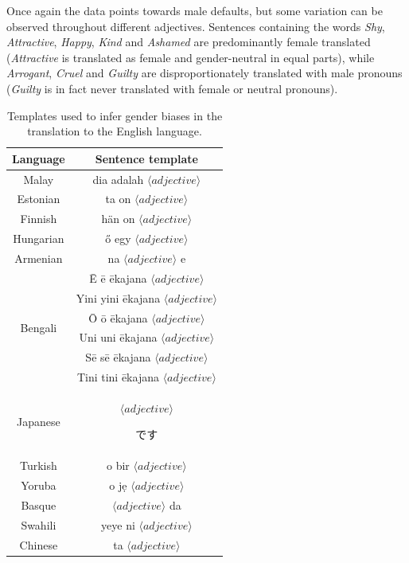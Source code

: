 \documentclass[fleqn,10pt]{article}
\begin{document}
Once again the data points towards male defaults, but some variation can be observed throughout different adjectives. Sentences containing the words \emph{Shy}, \emph{Attractive}, \emph{Happy}, \emph{Kind} and \emph{Ashamed} are predominantly female translated (\emph{Attractive} is translated as female and gender-neutral in equal parts), while \emph{Arrogant}, \emph{Cruel} and \emph{Guilty} are disproportionately translated with male pronouns (\emph{Guilty} is in fact never translated with female or neutral pronouns).

\begin{table}[H]
\centering
\small{
	\begin{tabular}{|c|c|}
	\hline
	Language 	& Sentence template 													\\ \hline \hline
	Malay		& dia adalah $\langle adjective \rangle$ 								\\ \hline
	Estonian	& ta on $\langle adjective \rangle$ 									\\ \hline
	Finnish		& hän on $\langle adjective \rangle$ 									\\ \hline
	Hungarian	& ő egy $\langle adjective \rangle$ 									\\ \hline
	Armenian	& na $\langle adjective \rangle$ e 									\\ \hline
	\multirow{6}{*}{Bengali}	& Ē ē ēkajana $\langle adjective \rangle$				\\
								& Yini yini ēkajana $\langle adjective \rangle$		\\
								& Ō ō ēkajana $\langle adjective \rangle$				\\
								& Uni uni ēkajana $\langle adjective \rangle$			\\
								& Sē sē ēkajana $\langle adjective \rangle$			\\
								& Tini tini ēkajana $\langle adjective \rangle$		\\ \hline
	Japanese	& $\langle adjective \rangle$ \begin{CJK*}{UTF8}{min}です\end{CJK*}		\\ \hline
	Turkish		& o bir $\langle adjective \rangle$ 									\\ \hline
	Yoruba		& o jẹ $\langle adjective \rangle$ 									\\ \hline
	Basque		& $\langle adjective \rangle$ da 										\\ \hline
	Swahili		& yeye ni $\langle adjective \rangle$ 									\\ \hline
	Chinese		& ta $\langle adjective \rangle$ 										\\ \hline
	\end{tabular}
	}
	\caption{Templates used to infer gender biases in the translation to the English language.}
	\label{tab:templates-adjectives}
\end{table}
\end{document}
